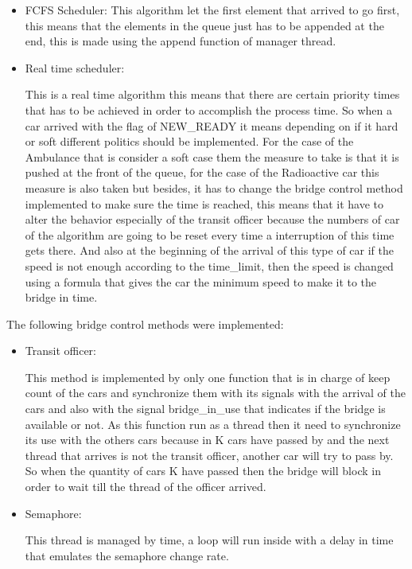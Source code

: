 \documentclass[a4paper,9pt]{article}
\begin{document}
\begin{itemize}
\begin{itemize}
\item FCFS Scheduler:
This algorithm let the first element that arrived to go first, this means that the elements in the queue just has to be appended at the end, this is made using the append function of manager thread.


\item Real time scheduler:

This is a real time algorithm this means that there are certain priority times that has to be achieved in order to accomplish the process time. So when a car arrived with the flag of NEW\_READY it means depending on if it hard or soft different politics should be implemented. For the case of the Ambulance  that is consider a soft case them the measure to take is that it is pushed at the front of the queue, for the case of the Radioactive car this measure is also taken but besides, it has to change the bridge control method implemented to make sure the time is reached, this means that it have to alter the behavior especially of the transit officer because the numbers of car of the algorithm are going to be reset every time	a interruption of this time gets there. And also at the beginning of the arrival of this type of car if the speed is not enough according to the time\_limit, then the speed is changed using a formula that gives the car the minimum speed to make it to the bridge in time.  


\end{itemize}
The following bridge control methods were implemented:
\begin{itemize}
\item Transit officer:

This method is implemented by only one function that is in charge of keep count of the cars and synchronize them with its signals with the arrival of the cars and also with the signal bridge\_in\_use that indicates if the bridge is available or not. As this function run as a thread then it need to synchronize its use with the others cars because in K cars have passed by and the next thread that arrives is not the transit officer, another car will try to pass by. So when the quantity of cars K have passed then the bridge will block in order to wait till the thread of the officer arrived.

\item Semaphore: 

This thread is managed by time, a loop will run inside with a delay in time that emulates the semaphore change rate.


\end{itemize}
\end{itemize}
\end{document}
